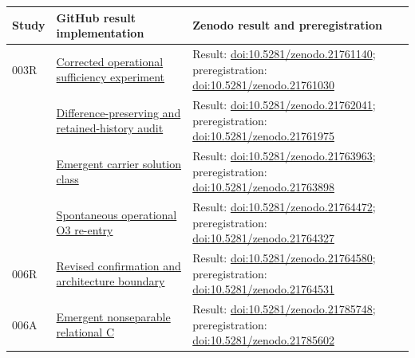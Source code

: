 \documentclass[11pt,a4paper]{article}
\begin{document}
\begin{longtable}{@{}>{\raggedright\arraybackslash}p{1.2cm}>{\raggedright\arraybackslash}p{5.0cm}>{\raggedright\arraybackslash}p{7.8cm}@{}}
\toprule
Study & GitHub result implementation & Zenodo result and preregistration \\
\midrule
\endhead
003R & \href{https://github.com/SIEL-Research/Subjectivity-Intersection-Mathematics/tree/main/experiments/003r_subjectivity_agent_class2_o3_corrected}{Corrected operational sufficiency experiment} & Result: \href{https://doi.org/10.5281/zenodo.21761140}{doi:10.5281/zenodo.21761140}; preregistration: \href{https://doi.org/10.5281/zenodo.21761030}{doi:10.5281/zenodo.21761030} \\
004 & \href{https://github.com/SIEL-Research/Subjectivity-Intersection-Mathematics/tree/main/experiments/004_difference_preserving_o3_discrimination}{Difference-preserving and retained-history audit} & Result: \href{https://doi.org/10.5281/zenodo.21762041}{doi:10.5281/zenodo.21762041}; preregistration: \href{https://doi.org/10.5281/zenodo.21761975}{doi:10.5281/zenodo.21761975} \\
005 & \href{https://github.com/SIEL-Research/Subjectivity-Intersection-Mathematics/tree/main/experiments/005_emergent_relational_carrier_solution_class}{Emergent carrier solution class} & Result: \href{https://doi.org/10.5281/zenodo.21763963}{doi:10.5281/zenodo.21763963}; preregistration: \href{https://doi.org/10.5281/zenodo.21763898}{doi:10.5281/zenodo.21763898} \\
006 & \href{https://github.com/SIEL-Research/Subjectivity-Intersection-Mathematics/tree/main/experiments/006_spontaneous_o3_reentry}{Spontaneous operational O3 re-entry} & Result: \href{https://doi.org/10.5281/zenodo.21764472}{doi:10.5281/zenodo.21764472}; preregistration: \href{https://doi.org/10.5281/zenodo.21764327}{doi:10.5281/zenodo.21764327} \\
006R & \href{https://github.com/SIEL-Research/Subjectivity-Intersection-Mathematics/tree/main/experiments/006r_spontaneous_o3_reentry_revised}{Revised confirmation and architecture boundary} & Result: \href{https://doi.org/10.5281/zenodo.21764580}{doi:10.5281/zenodo.21764580}; preregistration: \href{https://doi.org/10.5281/zenodo.21764531}{doi:10.5281/zenodo.21764531} \\
006A & \href{https://github.com/SIEL-Research/Subjectivity-Intersection-Mathematics/tree/main/experiments/006a_emergent_nonseparable_relational_c}{Emergent nonseparable relational C} & Result: \href{https://doi.org/10.5281/zenodo.21785748}{doi:10.5281/zenodo.21785748}; preregistration: \href{https://doi.org/10.5281/zenodo.21785602}{doi:10.5281/zenodo.21785602} \\
\bottomrule
\end{longtable}
\end{document}

